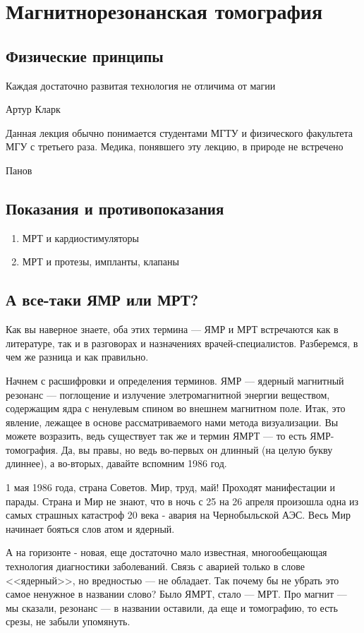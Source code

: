 \section{Магнитнорезонанская томография}

\subsection{Физические принципы}
\epigraph{Каждая достаточно развитая технология не отличима от магии}{Артур Кларк}
\epigraph{Данная лекция обычно понимается студентами МГТУ и физического факультета МГУ с третьего раза. Медика, понявшего эту лекцию, в природе не встречено}{Панов}

\subsection{Показания и противопоказания}

\begin{enumerate}
\item МРТ и кардиостимуляторы
\item МРТ и протезы, импланты, клапаны
\end{enumerate}


\subsection{А все-таки ЯМР или МРТ?}
Как вы наверное знаете, оба этих термина --- ЯМР и МРТ встречаются как в литературе, так и в разговорах и назначениях врачей-специалистов. Разберемся, в чем же разница и как правильно.

Начнем с расшифровки и определения терминов. ЯМР --- ядерный магнитный резонанс --- поглощение и излучение элетромагнитной энергии веществом, содержащим ядра с ненулевым спином во внешнем магнитном поле. Итак, это явление, лежащее в основе рассматриваемого нами метода визуализации. Вы можете возразить, ведь существует так же и термин ЯМРТ --- то есть ЯМР-томография. Да, вы правы, но ведь во-первых он длинный (на целую букву длиннее), а во-вторых, давайте вспомним 1986 год.

1 мая 1986 года, страна Советов. Мир, труд, май! Проходят манифестации и парады. Страна и Мир не знают, что в ночь с 25 на 26 апреля произошла одна из самых страшных катастроф 20 века - авария на Чернобыльской АЭС. Весь Мир начинает бояться слов атом и ядерный. 

А на горизонте - новая, еще достаточно мало известная, многообещающая технология диагностики заболеваний. Связь с аварией только в слове <<ядерный>>, но вредностью --- не обладает. Так почему бы не убрать это самое ненужное в названии слово? Было ЯМРТ, стало --- МРТ. Про магнит --- мы сказали, резонанс --- в названии оставили, да еще и томографию, то есть срезы, не забыли упомянуть. 

